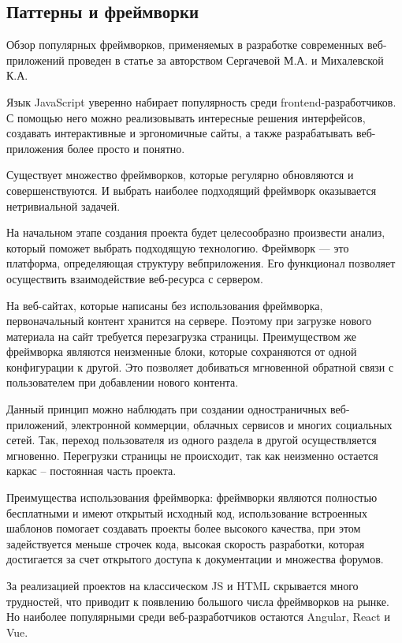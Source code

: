 \subsection{Паттерны и фреймворки}

Обзор популярных фреймворков, применяемых в разработке современных веб-приложений проведен в статье \cite{sergacheva-framework} за авторством Сергачевой М.А. и Михалевской К.А.

Язык JavaScript уверенно набирает популярность среди frontend-разработчиков.
С помощью него можно реализовывать интересные решения интерфейсов, создавать интерактивные и эргономичные сайты, а также разрабатывать веб-приложения более просто и понятно.

Существует множество фреймворков, которые регулярно обновляются и совершенствуются.
И выбрать наиболее подходящий фреймворк оказывается нетривиальной задачей.

На начальном этапе создания проекта будет целесообразно произвести анализ, который поможет
выбрать подходящую технологию.
Фреймворк — это платформа, определяющая структуру вебприложения.
Его функционал позволяет осуществить взаимодействие веб-ресурса с сервером.

На веб-сайтах, которые написаны без использования фреймворка, первоначальный контент хранится на сервере.
Поэтому при загрузке нового материала на сайт требуется перезагрузка страницы.
Преимуществом же фреймворка являются неизменные блоки, которые сохраняются от одной
конфигурации к другой.
Это позволяет добиваться мгновенной обратной связи с пользователем при добавлении нового контента.

Данный принцип можно наблюдать при создании одностраничных веб-приложений, электронной
коммерции, облачных сервисов и многих социальных сетей.
Так, переход пользователя из одного раздела в другой осуществляется мгновенно.
Перегрузки страницы не происходит, так как неизменно остается каркас – постоянная часть проекта.

Преимущества использования фреймворка: фреймворки являются полностью бесплатными и имеют открытый исходный код, использование встроенных шаблонов помогает создавать проекты более высокого качества, при этом задействуется меньше строчек кода, высокая скорость разработки, которая достигается за счет открытого доступа к документации и множества форумов.

За реализацией проектов на классическом JS и HTML скрывается много трудностей, что приводит к появлению большого числа фреймворков на рынке.
Но наиболее популярными среди веб-разработчиков остаются Angular, React и Vue.

